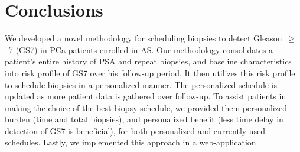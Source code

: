 \section{Conclusions}
We developed a novel methodology for scheduling biopsies to detect Gleason~$\geq$~7 (GS7) in PCa patients enrolled in AS. Our methodology consolidates a patient's entire history of PSA and repeat biopsies, and baseline characteristics into risk profile of GS7 over his follow-up period. It then utilizes this risk profile to schedule biopsies in a personalized manner. The personalized schedule is updated as more patient data is gathered over follow-up. To assist patients in making the choice of the best biopsy schedule, we provided them personalized burden (time and total biopsies), and personalized benefit (less time delay in detection of GS7 is beneficial), for both personalized and currently used schedules. Lastly, we implemented this approach in a web-application.